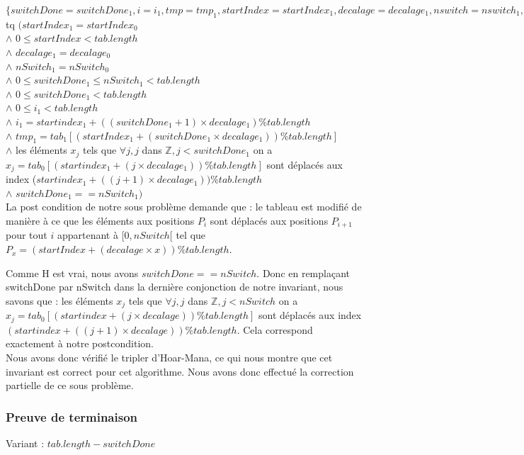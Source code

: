 $\{switchDone = switchDone_{1}, i = i_{1}, tmp = tmp_{1}, startIndex = startIndex_{1}, decalage = decalage_{1}, nswitch = nswitch_{1}, tab = tab_{1}\}$\\ 
tq $(startIndex_{1} = startIndex_{0}$\\
$\wedge$ $0 \leq startIndex < tab.length$\\
$\wedge$ $decalage_{1} = decalage_{0}$\\
$\wedge$ $nSwitch_{1} = nSwitch_{0}$\\
$\wedge$ $0 \leq switchDone_{1} \leq nSwitch_{1} < tab.length$\\
$\wedge$ $0\leq switchDone_{1} < tab.length$\\
$\wedge$ $0\leq i_{1} < tab.length$\\
$\wedge$ $i_{1} = startindex_{1} + ((switchDone_{1}+1)\times decalage_{1}) \% tab.length$\\
$\wedge$ $tmp_{1} = tab_{1}[(startIndex_{1} + (switchDone_{1}\times decalage_{1}))  \% tab.length]$\\
$\wedge$ les éléments $x_{j}$ tels que $\forall j, j$ dans $\mathbb{Z}, j<switchDone_{1}$ on a $x_{j}=tab_{0}[(startindex_{1} + (j\times decalage_{1})) \% tab.length]$ sont déplacés aux index ($startindex_{1} + ((j+1)\times  decalage_{1}))\% tab.length$\\
$\wedge$ $switchDone_{1} == nSwitch_{1})$ \\

La post condition de notre sous problème demande que : le tableau est modifié de manière à ce que les éléments aux positions $P_{i}$ sont déplacés aux positions $P_{i+1}$ pour tout $i$ appartenant à $[0,nSwitch[$ tel que $P_{x} = (startIndex + (decalage\times x)) \% tab.length$.

Comme H est vrai, nous avons $switchDone == nSwitch$. Donc en remplaçant switchDone par nSwitch dans la dernière conjonction de notre invariant, nous savons que : les éléments $x_{j}$ tels que $\forall j, j$ dans $\mathbb{Z}, j<nSwitch$ on a $x_{j}=tab_{0}[(startindex + (j\times decalage)) \% tab.length]$ sont déplacés aux index $(startindex + ((j+1)\times decalage)) \% tab.length.$ 
Cela correspond exactement à notre postcondition.\\

Nous avons donc vérifié le tripler d'Hoar-Mana, ce qui nous montre que cet invariant est correct pour cet algorithme. 
Nous avons donc effectué la correction partielle de ce sous problème. 


\subsubsection*{Preuve de terminaison}
Variant  : $tab.length - switchDone$

